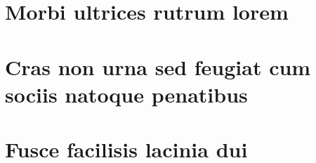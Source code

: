 \documentclass[
	12pt,				%
	openright,			%
	twoside,			%
	a4paper,			%
	english,			%
	french,				%
	spanish,			%
	brazil,				%
	]{abntex2}
\begin{document}
\begin{anexosenv}

\partanexos

\chapter{Morbi ultrices rutrum lorem}

\chapter{Cras non urna sed feugiat cum sociis natoque penatibus}

\chapter{Fusce facilisis lacinia dui}

\end{anexosenv}
\end{document}
